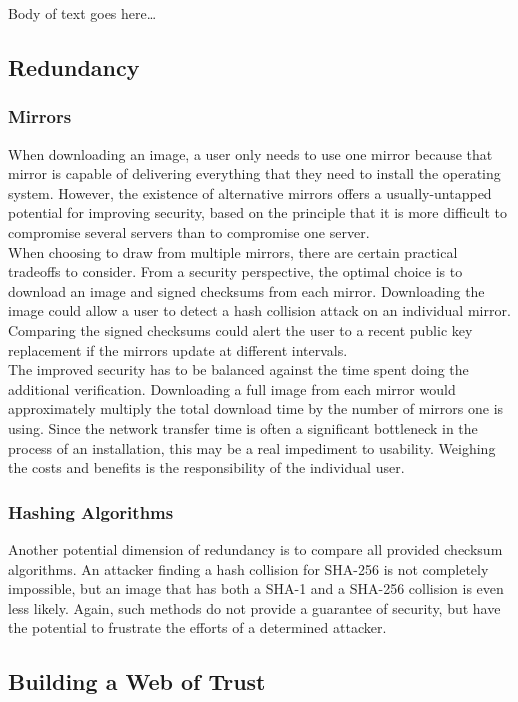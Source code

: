 \documentclass[conference]{IEEEtran}
\begin{document}
Body of text goes here\ldots

\subsection{Redundancy\label{redundancy}}

\subsubsection{Mirrors}

When downloading an image, a user only needs to use one mirror because that mirror is
capable of delivering everything that they need to install the operating system. However,
the existence of alternative mirrors offers a usually-untapped potential for improving
security, based on the principle that it is more difficult to compromise several servers
than to compromise one server.\\
\indent When choosing to draw from multiple mirrors, there are
certain practical tradeoffs to consider. From a security perspective, the optimal choice
is to download an image and signed checksums from each mirror. Downloading
the image could allow a user to detect a hash collision attack on an individual mirror.
Comparing the signed checksums could alert the user to a recent public key replacement if
the mirrors update at different intervals.\\
\indent The improved security has to be balanced against the time spent doing the additional
verification. Downloading a full image from each mirror would approximately multiply the
total download time by the number of mirrors one is using. Since the network transfer time
is often a significant bottleneck in the process of an installation, this may be a real
impediment to usability. Weighing the costs and benefits is the responsibility of the
individual user.

\subsubsection{Hashing Algorithms}
Another potential dimension of redundancy is to compare all provided checksum algorithms.
An attacker finding a hash collision for SHA-256 is not completely impossible, but an image
that has both a SHA-1 and a SHA-256 collision is even less likely. Again, such methods
do not provide a guarantee of security, but have the potential to frustrate the efforts of
a determined attacker.

\subsection{Building a Web of Trust}
\end{document}
